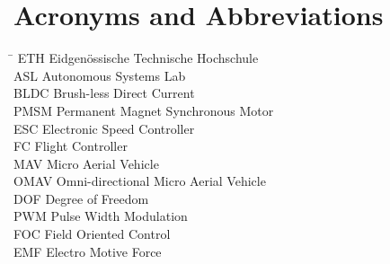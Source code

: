 \section*{Acronyms and Abbreviations}
\begin{tabbing}
 \hspace*{1.6cm}  \= \kill
 ETH \> Eidgenössische Technische Hochschule \\[0.5ex]
 ASL \> Autonomous Systems Lab \\[0.5ex]
 BLDC \> Brush-less Direct Current \\[0.5ex]
 PMSM \> Permanent Magnet Synchronous Motor \\[0.5ex]
 ESC \> Electronic Speed Controller \\[0.5ex]
 FC \> Flight Controller\\[0.5ex]
 MAV \> Micro Aerial Vehicle \\[0.5ex]
 OMAV \> Omni-directional Micro Aerial Vehicle\\[0.5ex]
 DOF \> Degree of Freedom\\[0.5ex] 
 PWM \> Pulse Width Modulation\\[0.5ex]
 FOC \> Field Oriented Control \\[0.5ex]
 EMF \> Electro Motive Force \\[0.5ex]
 \end{tabbing}